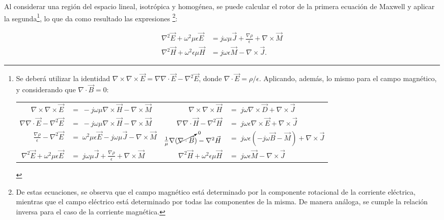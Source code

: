Al considerar una región del espacio lineal, isotrópica y homogénea, se puede calcular el rotor de la primera ecuación de Maxwell y aplicar la segunda\footnote{Se deberá utilizar la identidad $\nabla \times \nabla \times \vec{E} = \nabla \nabla \cdot \vec{E} - \nabla^2\vec{E}$, donde $\nabla \cdot \vec{E} = \rho/\epsilon$. Aplicando, además, lo mismo para el campo magnético, y considerando que $\nabla \cdot \vec{B} = 0$: \newline %
	
	
	\begin{tabular}{ r l | r l }
		 $\nabla \times \nabla \times \vec{E}$ & $=\; -j \omega \mu \nabla \times \vec{H} - \nabla \times \vec{M}$ & $\nabla \times \nabla \times \vec{H}$ & $=\; j \omega \nabla \times \vec{D} +  \nabla \times \vec{J}$ \\
		 $\nabla \nabla \cdot \vec{E} - \nabla^2 \vec{E}$ & $=\; -j \omega \mu \nabla \times \vec{H} - \nabla \times \vec{M}$ & $\nabla \nabla \cdot \vec{H} - \nabla^2 \vec{H}$ & $=\; j \omega \epsilon \nabla \times \vec{E} + \nabla \times \vec{J}$ \\
		 $\frac{\nabla \rho}{\epsilon} - \nabla^2 \vec{E}$ & $=\; \omega^2 \mu \epsilon \vec{E} - j \omega \mu \vec{J} - \nabla \times \vec{M}$ & $\frac{1}{\mu} \nabla (\cancelto{0}{\nabla \cdot \vec{B}}) - \nabla^2 \vec{H}$ & $=\; j \omega \epsilon (-j \omega \vec{B} - \vec{M}) + \nabla \times \vec{J}$ \\
		 $\nabla^2 \vec{E} + \omega^2 \mu \epsilon \vec{E}$ & $=\; j \omega \mu \vec{J} + \frac{\nabla \rho}{\epsilon} + \nabla \times \vec{M}$ & $\nabla^2 \vec{H} + \omega^2 \epsilon \mu \vec{H}$ & $=\;  j \omega \epsilon \vec{M} - \nabla \times \vec{J}$
	\end{tabular}	
	}, lo que da como resultado las expresiones \footnote{De estas ecuaciones, se observa que el campo magnético está determinado por la componente rotacional de la corriente eléctrica, mientras que el campo eléctrico está determinado por todas las componentes de la misma. De manera análoga, se cumple la relación inversa para el caso de la corriente magnética.}:

\begin{subequations}
	\begin{align}
		\nabla^2 \vec{E} + \omega^2 \mu \epsilon \vec{E} & = j \omega \mu \vec{J} + \frac{\nabla \rho}{\epsilon} + \nabla \times \vec{M} \label{eq:eq_ondas_completa_E} \\
		\nabla^2 \vec{H} + \omega^2 \epsilon \mu \vec{H} & =  j \omega \epsilon \vec{M} - \nabla \times \vec{J}. \label{eq:eq_ondas_completa_H}
	\end{align}
	\label{eq:eq_ondas_completa_E_H}
\end{subequations}

